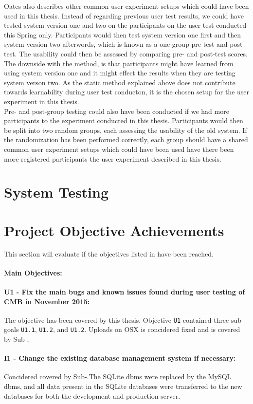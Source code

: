 Oates also describes other common user experiment setups which could have been used in this thesis. Instead of regarding previous user test results, we could have tested system version one and two on the participants on the user test conducted this Spring only. Participants would then test system version one first and then system version two afterwords, which is known as a one group pre-test and post-test. The usability could then be assessed by comparing pre- and post-test scores. The downside with the method, is that participants might have learned from using system version one and it might effect the results when they are testing system verson two. As the static method explained above does not contribute towards learnability during user test conducton, it is the chosen setup for the user experiment in this thesis. \\

Pre- and post-group testing could also have been conducted if we had more participants to the experiment conducted in this thesis. Participants would then be split into two random groups, each assessing the usability of the old system. If the randomization has been performed correctly, each group should have a shared
common user experiment setups which could have been used have there been more registered participants the user experiment described in this thesis.

\section{System Testing}
\label{sec:eval-sys-testing}

\section{Project Objective Achievements}
\label{sec:eval-pr-achiev}
This section will evaluate if the objectives listed in  have been reached.

\paragraph*{Main Objectives:} \hfill

\paragraph*{U1 - Fix the main bugs and known issues found during user testing of CMB in November 2015:} The objective has been covered by this thesis. Objective \texttt{U1} contained three sub-goals \texttt{U1.1}, \texttt{U1.2}, and \texttt{U1.2}. Uploads on OSX is concidered fixed and is covered by Sub-\Cref{},

\paragraph*{I1 - Change the existing database management system if necessary:} Concidered covered by Sub-.The SQLite \gls{dbms} were replaced by the MySQL \gls{dbms}, and all data present in the SQLite databases were transferred to the new databases for both the development and production server.
